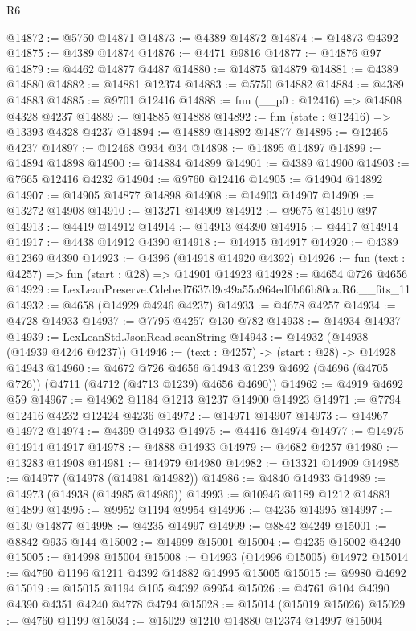 \begin{lexlean}{R6}
\begin{coremodule}
@14872 := @5750 @14871
@14873 := @4389 @14872
@14874 := @14873 @4392
@14875 := @4389 @14874
@14876 := @4471 @9816
@14877 := @14876 @97
@14879 := @4462 @14877 @4487
@14880 := @14875 @14879
@14881 := @4389 @14880
@14882 := @14881 @12374
@14883 := @5750 @14882
@14884 := @4389 @14883
@14885 := @9701 @12416
@14888 := fun (__p0 : @12416) => @14808 @4328 @4237
@14889 := @14885 @14888
@14892 := fun (state : @12416) => @13393 @4328 @4237
@14894 := @14889 @14892 @14877
@14895 := @12465 @4237
@14897 := @12468 @934 @34
@14898 := @14895 @14897
@14899 := @14894 @14898
@14900 := @14884 @14899
@14901 := @4389 @14900
@14903 := @7665 @12416 @4232
@14904 := @9760 @12416
@14905 := @14904 @14892
@14907 := @14905 @14877 @14898
@14908 := @14903 @14907
@14909 := @13272 @14908
@14910 := @13271 @14909
@14912 := @9675 @14910 @97
@14913 := @4419 @14912
@14914 := @14913 @4390
@14915 := @4417 @14914
@14917 := @4438 @14912 @4390
@14918 := @14915 @14917
@14920 := @4389 @12369 @4390
@14923 := @4396 (@14918 @14920 @4392)
@14926 := fun (text : @4257) => fun (start : @28) => @14901 @14923
@14928 := @4654 @726 @4656
@14929 := LexLeanPreserve.Cdebed7637d9c49a55a964ed0b66b80ca.R6.__fits_11
@14932 := @4658 (@14929 @4246 @4237)
@14933 := @4678 @4257
@14934 := @4728 @14933
@14937 := @7795 @4257 @130 @782
@14938 := @14934 @14937
@14939 := LexLeanStd.JsonRead.scanString
@14943 := @14932 (@14938 (@14939 @4246 @4237))
@14946 := (text : @4257) -> (start : @28) -> @14928 @14943
@14960 := @4672
    @726
    @4656
    @14943
    @1239
    @4692
    (@4696 (@4705 @726))
    (@4711 (@4712 (@4713 @1239) @4656 @4690))
@14962 := @4919 @4692 @59
@14967 := @14962 @1184 @1213 @1237 @14900 @14923
@14971 := @7794 @12416 @4232 @12424 @4236
@14972 := @14971 @14907
@14973 := @14967 @14972
@14974 := @4399 @14933
@14975 := @4416 @14974
@14977 := @14975 @14914 @14917
@14978 := @4888 @14933
@14979 := @4682 @4257
@14980 := @13283 @14908
@14981 := @14979 @14980
@14982 := @13321 @14909
@14985 := @14977 (@14978 (@14981 @14982))
@14986 := @4840 @14933
@14989 := @14973 (@14938 (@14985 @14986))
@14993 := @10946 @1189 @1212 @14883 @14899
@14995 := @9952 @1194 @9954
@14996 := @4235 @14995
@14997 := @130 @14877
@14998 := @4235 @14997
@14999 := @8842 @4249
@15001 := @8842 @935 @144
@15002 := @14999 @15001
@15004 := @4235 @15002 @4240
@15005 := @14998 @15004
@15008 := @14993 (@14996 @15005) @14972
@15014 := @4760 @1196 @1211 @4392 @14882 @14995 @15005
@15015 := @9980 @4692
@15019 := @15015 @1194 @105 @4392 @9954
@15026 := @4761 @104 @4390 @4390 @4351 @4240 @4778 @4794
@15028 := @15014 (@15019 @15026)
@15029 := @4760 @1199
@15034 := @15029 @1210 @14880 @12374 @14997 @15004

\end{coremodule}
\end{lexlean}
